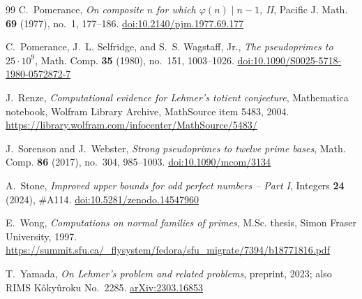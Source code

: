 \documentclass[11pt,reqno]{amsart}
\numberwithin{equation}{section}
\theoremstyle{plain}
\theoremstyle{definition}
\theoremstyle{remark}
\begin{document}
\begin{thebibliography}{99}
C.~Pomerance,
\emph{On composite $n$ for which $\varphi(n)\mid n-1$, II},
Pacific J. Math. \textbf{69} (1977), no.~1, 177--186.
\href{https://doi.org/10.2140/pjm.1977.69.177}{doi:10.2140/pjm.1977.69.177}

C.~Pomerance, J.~L. Selfridge, and S.~S. Wagstaff, Jr.,
\emph{The pseudoprimes to $25\cdot10^9$},
Math. Comp. \textbf{35} (1980), no.~151, 1003--1026.
\href{https://doi.org/10.1090/S0025-5718-1980-0572872-7}{doi:10.1090/S0025-5718-1980-0572872-7}

J.~Renze,
\emph{Computational evidence for Lehmer's totient conjecture},
Mathematica notebook, Wolfram Library Archive, MathSource item 5483, 2004.
\url{https://library.wolfram.com/infocenter/MathSource/5483/}

J.~Sorenson and J.~Webster,
\emph{Strong pseudoprimes to twelve prime bases},
Math. Comp. \textbf{86} (2017), no.~304, 985--1003.
\href{https://doi.org/10.1090/mcom/3134}{doi:10.1090/mcom/3134}

A.~Stone,
\emph{Improved upper bounds for odd perfect numbers -- Part I},
Integers \textbf{24} (2024), \#A114.
\href{https://doi.org/10.5281/zenodo.14547960}{doi:10.5281/zenodo.14547960}

E.~Wong,
\emph{Computations on normal families of primes},
M.Sc. thesis, Simon Fraser University, 1997.
\url{https://summit.sfu.ca/_flysystem/fedora/sfu_migrate/7394/b18771816.pdf}

T.~Yamada,
\emph{On Lehmer's problem and related problems},
preprint, 2023; also RIMS K\^oky\^uroku No.~2285.
\href{https://arxiv.org/abs/2303.16853}{arXiv:2303.16853}

\end{thebibliography}
\end{document}
